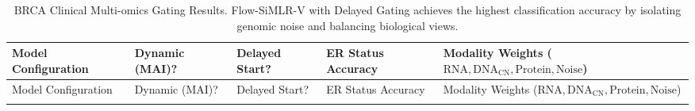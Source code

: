\documentclass[
  letterpaper,
]{report}
\begin{document}
\begin{longtable}[]{@{}
  >{\raggedright\arraybackslash}p{}
  >{\centering\arraybackslash}p{}
  >{\centering\arraybackslash}p{}
  >{\centering\arraybackslash}p{}
  >{\raggedright\arraybackslash}p{}@{}}
\caption{BRCA Clinical Multi-omics Gating Results. Flow-SiMLR-V with
Delayed Gating achieves the highest classification accuracy by isolating
genomic noise and balancing biological
views.}\label{tbl-brca-gating-results}\tabularnewline
\toprule\noalign{}
\begin{minipage}[b]{\linewidth}\raggedright
Model Configuration
\end{minipage} & \begin{minipage}[b]{\linewidth}\centering
Dynamic (MAI)?
\end{minipage} & \begin{minipage}[b]{\linewidth}\centering
Delayed Start?
\end{minipage} & \begin{minipage}[b]{\linewidth}\centering
ER Status Accuracy
\end{minipage} & \begin{minipage}[b]{\linewidth}\raggedright
Modality Weights
(\(\text{RNA}, \text{DNA}_{\text{CN}}, \text{Protein}, \text{Noise}\))
\end{minipage} \\
\midrule\noalign{}
\endfirsthead
\toprule\noalign{}
\begin{minipage}[b]{\linewidth}\raggedright
Model Configuration
\end{minipage} & \begin{minipage}[b]{\linewidth}\centering
Dynamic (MAI)?
\end{minipage} & \begin{minipage}[b]{\linewidth}\centering
Delayed Start?
\end{minipage} & \begin{minipage}[b]{\linewidth}\centering
ER Status Accuracy
\end{minipage} & \begin{minipage}[b]{\linewidth}\raggedright
Modality Weights
(\(\text{RNA}, \text{DNA}_{\text{CN}}, \text{Protein}, \text{Noise}\))
\end{minipage} \\
\midrule\noalign{}
\endhead
\bottomrule\noalign{}

\end{longtable}
\end{document}
